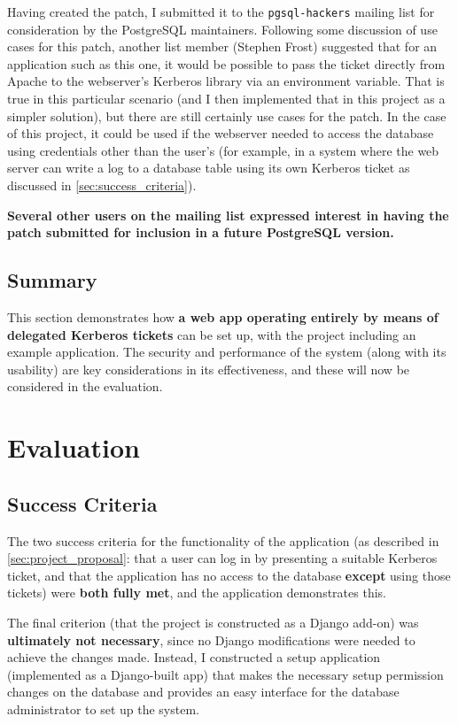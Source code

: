 \documentclass[12pt]{report}
\begin{document}
Having created the patch, I submitted it to the \texttt{pgsql-hackers} mailing list for consideration by the PostgreSQL maintainers\cite{postgres-patch-list}. Following some discussion of use cases for this patch, another list member (Stephen Frost) suggested that for an application such as this one, it would be possible to pass the ticket directly from Apache to the webserver's Kerberos library via an environment variable. That is true in this particular scenario (and I then implemented that in this project as a simpler solution), but there are still certainly use cases for the patch. In the case of this project, it could be used if the webserver needed to access the database using credentials other than the user's (for example, in a system where the web server can write a log to a database table using its own Kerberos ticket as discussed in \autoref{sec:success_criteria}).

\textbf{Several other users on the mailing list expressed interest in having the patch submitted for inclusion in a future PostgreSQL version.}

\section{Summary}
This section demonstrates how \textbf{a web app operating entirely by means of delegated Kerberos tickets} can be set up, with the project including an example application. The security and performance of the system (along with its usability) are key considerations in its effectiveness, and these will now be considered in the evaluation.

\chapter{Evaluation}

\section{Success Criteria}
\label{sec:success_criteria}
The two success criteria for the functionality of the application (as described in \autoref{sec:project_proposal}: that a user can log in by presenting a suitable Kerberos ticket, and that the application has no access to the database \textbf{except} using those tickets) were \textbf{both fully met}, and the application demonstrates this.

The final criterion (that the project is constructed as a Django add-on) was \textbf{ultimately not necessary}, since no Django modifications were needed to achieve the changes made. Instead, I constructed a setup application (implemented as a Django-built app) that makes the necessary setup permission changes on the database and provides an easy interface for the database administrator to set up the system.
\end{document}
